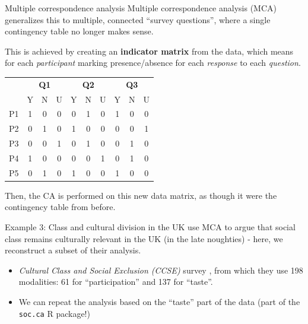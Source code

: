 \documentclass[aspectratio=169, 10pt]{beamer}
\begin{document}
\begin{frame}{Multiple correspondence analysis}
    Multiple correspondence analysis (MCA) generalizes this to multiple, connected \enquote{survey questions}, where a single contingency table no longer makes sense.

    This is achieved by creating an \textbf{indicator matrix} from the data, which means for each \textit{participant} marking presence/absence for each \textit{response} to each \textit{question}.

    \vspace{0.5em}
    {\centering\scriptsize
    \begin{tabular}{l|ccc|ccc|ccc}
        & \multicolumn{3}{c|}{\textbf{Q1}} & \multicolumn{3}{c|}{\textbf{Q2}} & \multicolumn{3}{c}{\textbf{Q3}} \\
        & Y & N & U & Y & N & U & Y & N & U \\
        \hline
        P1 & 1 & 0 & 0 & 0 & 1 & 0 & 1 & 0 & 0 \\
        P2 & 0 & 1 & 0 & 1 & 0 & 0 & 0 & 0 & 1 \\
        P3 & 0 & 0 & 1 & 0 & 1 & 0 & 0 & 1 & 0 \\
        P4 & 1 & 0 & 0 & 0 & 0 & 1 & 0 & 1 & 0 \\
        P5 & 0 & 1 & 0 & 1 & 0 & 0 & 1 & 0 & 0 \\
    \end{tabular}\par}

	Then, the CA is performed on this new data matrix, as though it were the contingency table from before.
\end{frame}

\begin{frame}{Example 3: Class and cultural division in the UK}
    \textcite{lerouxClassCulturalDivision2008} use MCA to argue that social class remains culturally relevant in the UK (in the late noughties) - here, we reconstruct a subset of their analysis.
    \begin{itemize}
    	\item \textit{Cultural Class and Social Exclusion (CCSE)} survey \parencite{brownCulturalCapitalSocial1995}, from which they use 198 modalities: 61 for \enquote{participation} and 137 for \enquote{taste}.
		\item We can repeat the analysis based on the \enquote{taste} part of the data (part of the \texttt{soc.ca} R package!)
    \end{itemize}
\end{frame}
\end{document}
